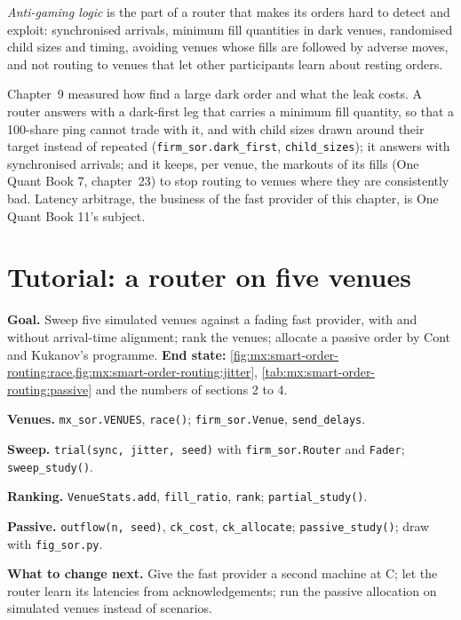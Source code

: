 \begin{definition}\label{def:mx:smart-order-routing:antigaming}
\emph{Anti-gaming logic} is the part of a router that makes its orders hard to detect and exploit: synchronised arrivals,
minimum fill quantities in dark venues, randomised child sizes and timing, avoiding venues whose fills are followed by adverse moves, and not routing
to venues that let other participants learn about resting orders.
\end{definition}

Chapter~9 measured how  find a large dark order and what the leak costs. A router answers with a dark-first leg that carries a minimum
fill quantity, so that a 100-share ping cannot trade with it, and with child sizes drawn around their target instead of repeated
(\texttt{firm\_sor.dark\_first}, \texttt{child\_sizes}); it answers  with synchronised arrivals; and it keeps, per venue, the markouts of its
fills (One Quant Book 7, chapter~23) to stop routing to venues where they are consistently bad. Latency arbitrage, the business of the fast provider
of this chapter, is One Quant Book 11's subject.

\section{Tutorial: a router on five venues}\label{tut:mx:smart-order-routing:tut}

\begin{tutorial}
\textbf{Goal.} Sweep five simulated venues against a fading fast provider, with and without arrival-time alignment; rank the venues; allocate a
passive order by Cont and Kukanov's programme.
\textbf{End state:} \cref{fig:mx:smart-order-routing:race,fig:mx:smart-order-routing:jitter}, \cref{tab:mx:smart-order-routing:passive} and the numbers
of sections 2 to 4.
\begin{tutsteps}
\item \textbf{Venues.} \texttt{mx\_sor.VENUES}, \texttt{race()}; \texttt{firm\_sor.Venue}, \texttt{send\_delays}.
\item \textbf{Sweep.} \texttt{trial(sync, jitter, seed)} with \texttt{firm\_sor.Router} and \texttt{Fader}; \texttt{sweep\_study()}.
\item \textbf{Ranking.} \texttt{VenueStats.add}, \texttt{fill\_ratio}, \texttt{rank}; \texttt{partial\_study()}.
\item \textbf{Passive.} \texttt{outflow(n, seed)}, \texttt{ck\_cost}, \texttt{ck\_allocate}; \texttt{passive\_study()}; draw with \texttt{fig\_sor.py}.
\end{tutsteps}
\textbf{What to change next.} Give the fast provider a second machine at C; let the router learn its latencies from acknowledgements; run the passive
allocation on simulated venues instead of scenarios.
\end{tutorial}

